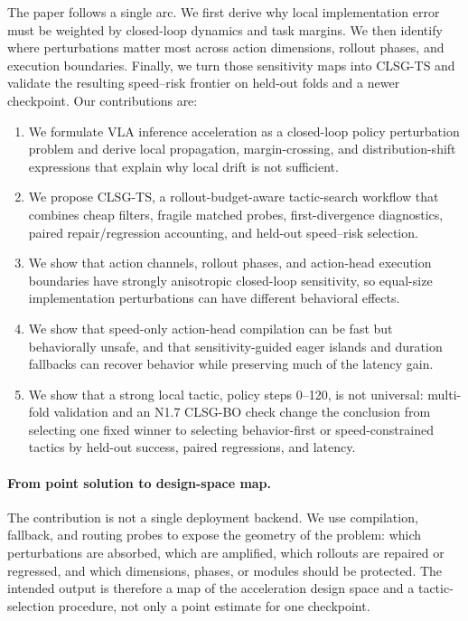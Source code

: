 \documentclass[10pt]{article}
\begin{document}
The paper follows a single arc. We first derive why local implementation error must be weighted by closed-loop dynamics and task margins. We then identify where perturbations matter most across action dimensions, rollout phases, and execution boundaries. Finally, we turn those sensitivity maps into CLSG-TS and validate the resulting speed--risk frontier on held-out folds and a newer checkpoint. Our contributions are:
\begin{enumerate}
    \item We formulate VLA inference acceleration as a closed-loop policy perturbation problem and derive local propagation, margin-crossing, and distribution-shift expressions that explain why local drift is not sufficient.
    \item We propose CLSG-TS, a rollout-budget-aware tactic-search workflow that combines cheap filters, fragile matched probes, first-divergence diagnostics, paired repair/regression accounting, and held-out speed--risk selection.
    \item We show that action channels, rollout phases, and action-head execution boundaries have strongly anisotropic closed-loop sensitivity, so equal-size implementation perturbations can have different behavioral effects.
    \item We show that speed-only action-head compilation can be fast but behaviorally unsafe, and that sensitivity-guided eager islands and duration fallbacks can recover behavior while preserving much of the latency gain.
    \item We show that a strong local tactic, policy steps 0--120, is not universal: multi-fold validation and an N1.7 CLSG-BO check change the conclusion from selecting one fixed winner to selecting behavior-first or speed-constrained tactics by held-out success, paired regressions, and latency.
\end{enumerate}

\paragraph{From point solution to design-space map.}
The contribution is not a single deployment backend. We use compilation, fallback, and routing probes to expose the geometry of the problem: which perturbations are absorbed, which are amplified, which rollouts are repaired or regressed, and which dimensions, phases, or modules should be protected. The intended output is therefore a map of the acceleration design space and a tactic-selection procedure, not only a point estimate for one checkpoint.
\end{document}
